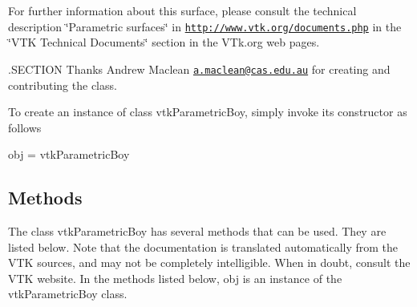 For further information about this surface, please consult the technical description \char`\"{}\-Parametric surfaces\char`\"{} in \href{http://www.vtk.org/documents.php}{\tt http\-://www.\-vtk.\-org/documents.\-php} in the \char`\"{}\-V\-T\-K Technical Documents\char`\"{} section in the V\-Tk.\-org web pages.

.S\-E\-C\-T\-I\-O\-N Thanks Andrew Maclean \href{mailto:a.maclean@cas.edu.au}{\tt a.\-maclean@cas.\-edu.\-au} for creating and contributing the class.

To create an instance of class vtk\-Parametric\-Boy, simply invoke its constructor as follows \begin{DoxyVerb}  obj = vtkParametricBoy
\end{DoxyVerb}
 \hypertarget{vtkwidgets_vtkxyplotwidget_Methods}{}\subsection{Methods}\label{vtkwidgets_vtkxyplotwidget_Methods}
The class vtk\-Parametric\-Boy has several methods that can be used. They are listed below. Note that the documentation is translated automatically from the V\-T\-K sources, and may not be completely intelligible. When in doubt, consult the V\-T\-K website. In the methods listed below, {\ttfamily obj} is an instance of the vtk\-Parametric\-Boy class. 
